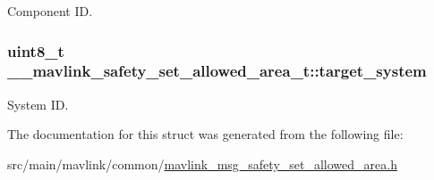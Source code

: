 Component I\+D. 

\hypertarget{struct____mavlink__safety__set__allowed__area__t_acd133dd7eb95a5846b4354acdb74bef1}{
\subsubsection[{target\+\_\+system}]{\setlength{\rightskip}{0pt plus 5cm}uint8\+\_\+t \+\_\+\+\_\+mavlink\+\_\+safety\+\_\+set\+\_\+allowed\+\_\+area\+\_\+t\+::target\+\_\+system}}\label{struct____mavlink__safety__set__allowed__area__t_acd133dd7eb95a5846b4354acdb74bef1}


System I\+D. 



The documentation for this struct was generated from the following file\+:\begin{DoxyCompactItemize}
\item 
src/main/mavlink/common/\hyperlink{mavlink__msg__safety__set__allowed__area_8h}{mavlink\+\_\+msg\+\_\+safety\+\_\+set\+\_\+allowed\+\_\+area.\+h}\end{DoxyCompactItemize}
